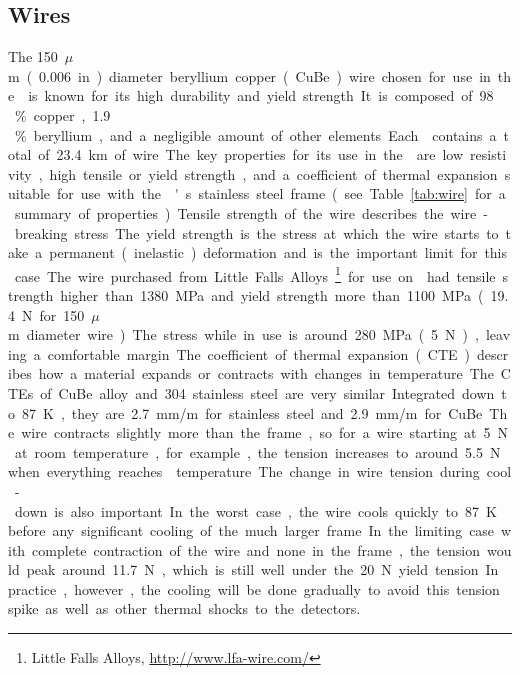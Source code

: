 \subsection{Wires}
\label{sec:fdsp-apa-wires}

The \SI{150}{$\mu$m} (\SI{.006}{in}) diameter beryllium copper (CuBe) wire chosen for use in the  is known for its high durability and yield strength. It is composed of \num{98}\,\% copper, \num{1.9}\,\% beryllium, and a negligible amount of other elements. Each  contains a total of \SI{23.4}{km} of wire.  

The key properties for its use in the  are low resistivity, high tensile or yield strength, and a coefficient of thermal expansion suitable for use with the 's stainless steel frame (see Table~\ref{tab:wire} for a summary of properties).  Tensile strength of the wire describes the wire-breaking stress.  The yield strength is the stress at which the wire starts to take a permanent (inelastic) deformation and is the important limit for this case. The wire purchased from Little Falls Alloys~\footnote{Little Falls Alloys\texttrademark, \url{http://www.lfa-wire.com/}} for use on  had tensile strength higher than \SI{1380}{MPa} and yield strength more than \SI{1100}{MPa} (\SI{19.4}{N} for \SI{150}{$\mu$m} diameter wire).  The stress while in use is around \SI{280}{MPa} (\SI{5}{N}), leaving a comfortable margin.

The coefficient of thermal expansion (CTE) describes how a material expands or contracts with changes in temperature.  The CTEs of CuBe alloy and \num{304} stainless steel are very similar.  Integrated down to \SI{87}{K}, they are \SI{2.7}{mm/m} for stainless steel and \SI{2.9}{mm/m} for CuBe. The wire contracts slightly more than the frame, so for a wire starting at \SI{5}{N} at room temperature, for example, the tension increases to around \SI{5.5}{N} when everything reaches \lar temperature.  

The change in wire tension during cool-down is also important.  In the worst case, the wire cools quickly to \SI{87}{K} before any significant cooling of the much larger frame.  In the limiting case with complete contraction of the wire and none in the frame, the tension would peak around \SI{11.7}{N}, which is still well under the \SI{20}{N} yield tension. In practice, however, the cooling will be done gradually to avoid this tension spike as well as other thermal shocks to the detectors.

